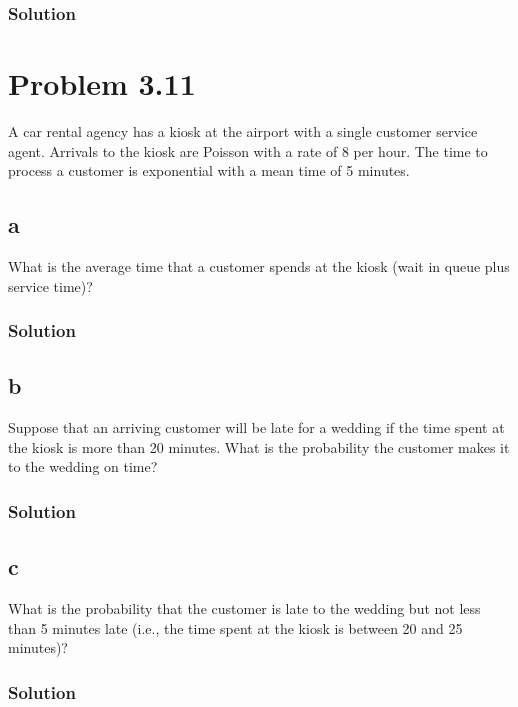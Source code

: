 \documentclass{amsart}
\begin{document}
\subsubsection*{Solution}

\section{Problem 3.11} %
A car rental agency has a kiosk at the airport with a single customer service
agent. Arrivals to the kiosk are Poisson with a rate of 8 per hour. The time
to process a customer is exponential with a mean time of 5 minutes.
\subsection*{a}
What is the average time that a customer spends at the kiosk (wait in
queue plus service time)?
\subsubsection*{Solution}
\subsection*{b}
Suppose that an arriving customer will be late for a wedding if the time
spent at the kiosk is more than 20 minutes. What is the probability the
customer makes it to the wedding on time?
\subsubsection*{Solution}
\subsection*{c}
What is the probability that the customer is late to the wedding but not
less than 5 minutes late (i.e., the time spent at the kiosk is between 20
and 25 minutes)?
\subsubsection*{Solution}
\end{document}
